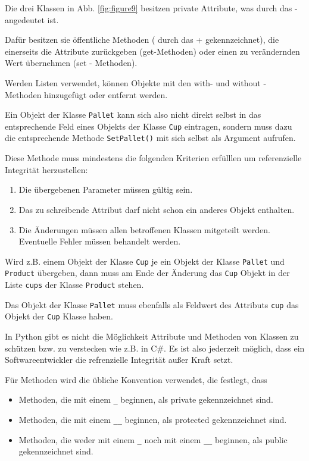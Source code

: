 Die drei Klassen in Abb. \ref{fig:figure9} besitzen private Attribute, was durch das \glqq -\grqq{} angedeutet ist.

Dafür besitzen sie öffentliche Methoden ( durch das \glqq +\grqq{} gekennzeichnet), die einerseits die Attribute zurückgeben (get-Methoden) oder einen zu verändernden
Wert übernehmen (set - Methoden).

Werden Listen verwendet, können Objekte mit den with- und without - Methoden hinzugefügt oder entfernt werden.

Ein Objekt der Klasse \verb|Pallet| kann sich also nicht direkt selbst in das entsprechende Feld eines Objekts der Klasse
\verb|Cup| eintragen, sondern muss dazu die entsprechende Methode \verb|SetPallet()| mit sich selbst als Argument aufrufen.

Diese Methode muss mindestens die folgenden Kriterien erfülllen um referenzielle Integrität herzustellen:

\begin{enumerate}
        \item Die übergebenen Parameter müssen gültig sein.
        \item Das zu schreibende Attribut darf nicht schon ein anderes Objekt enthalten.
        \item Die Änderungen müssen allen betroffenen Klassen mitgeteilt werden. Eventuelle Fehler müssen behandelt werden.
\end{enumerate}


Wird z.B. einem Objekt der Klasse \verb|Cup| je ein Objekt der Klasse  \verb|Pallet| und \verb|Product|
übergeben, dann muss am Ende der Änderung das \verb|Cup| Objekt in der Liste \verb|cups| der Klasse \verb|Product| stehen.

Das Objekt der Klasse \verb|Pallet| muss ebenfalls als Feldwert des Attributs \verb|cup| das Objekt der \verb|Cup| Klasse haben.

In Python gibt es nicht die Möglichkeit Attribute und Methoden von Klassen zu schützen bzw. zu verstecken wie z.B. in C$\#$.
Es ist also jederzeit möglich, dass ein Softwareentwickler die refrenzielle Integrität außer Kraft setzt. 

Für Methoden wird die übliche Konvention verwendet, die festlegt, dass
\begin{itemize}
        \item Methoden, die mit einem \glqq \verb|_|\grqq{} beginnen, als private gekennzeichnet sind.
        \item Methoden, die mit einem \glqq\verb|__|\grqq{} beginnen, als protected gekennzeichnet sind.
        \item Methoden, die weder mit einem \glqq\verb|_|\grqq{} noch mit einem \glqq\verb|__|\grqq{} beginnen, als public gekennzeichnet sind.
\end{itemize}

